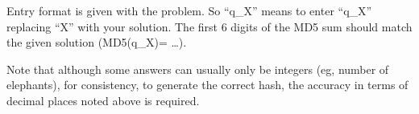 Entry format is given with the problem. So ``q\_X'' means to enter ``q\_X'' replacing ``X'' with your solution. The first 6 digits of the MD5 sum should match the given solution (MD5(q\_X)= \ldots).

Note that although some answers can usually only be integers (eg, number of elephants), for consistency, to generate the correct hash, the accuracy in terms of decimal places noted above is required.
